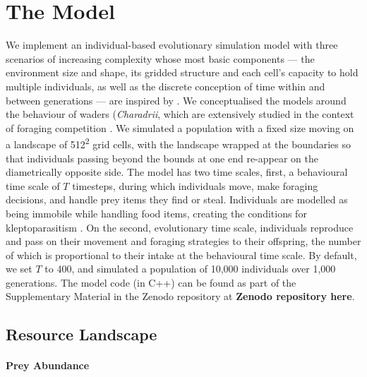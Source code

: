\documentclass[11pt]{article}
\begin{document}
\section{The Model}

We implement an individual-based evolutionary simulation model with three scenarios of increasing complexity whose most basic components --- the environment size and shape, its gridded structure and each cell's capacity to hold multiple individuals, as well as the discrete conception of time within and between generations --- are inspired by \citet{netz2020}.
We conceptualised the models around the behaviour of waders (\textit{Charadrii}, which are extensively studied in the context of foraging competition \citep[e.g.][]{vahl2005, vahl2005a, vahl2007, rutten2010a, rutten2010}.
We simulated a population with a fixed size moving on a landscape of 512\textsuperscript{2} grid cells, with the landscape wrapped at the boundaries so that individuals passing beyond the bounds at one end re-appear on the diametrically opposite side.
The model has two time scales, first, a behavioural time scale of $T$ timesteps, during which individuals move, make foraging decisions, and handle prey items they find or steal.
Individuals are modelled as being immobile while handling food items, creating the conditions for kleptoparasitism \citep{brockmann1979}.
On the second, evolutionary time scale, individuals reproduce and pass on their movement and foraging strategies to their offspring, the number of which is proportional to their intake at the behavioural time scale.
By default, we set $T$ to 400, and simulated a population of 10,000 individuals over 1,000 generations.
The model code (in C++) can be found as part of the Supplementary Material in the Zenodo repository at \textbf{Zenodo repository here}.

\subsection{Resource Landscape}

\paragraph{Prey Abundance}
\end{document}
